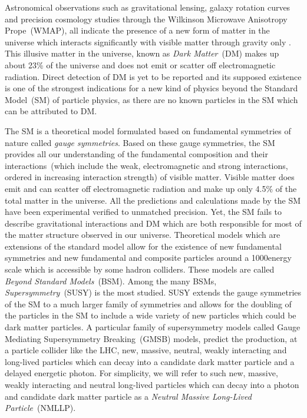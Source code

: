 \par
  Astronomical observations such as gravitational lensing, galaxy rotation curves and precision cosmology studies through the Wilkinson Microwave Anisotropy Prope~(WMAP), all indicate the presence of a new form of matter in the universe which interacts significantly with visible matter through gravity only \cite{DM}. This illusive matter in the universe, known as \textit{Dark Matter}~(DM) makes up about 23\% of the universe and does not emit or scatter off electromagnetic radiation. Direct detection of  DM is yet to be reported and its supposed existence is one of the strongest indications for a new kind of physics beyond the Standard Model~(SM) of particle physics, as there are no known particles in the SM which can be attributed to DM. 
\par
The SM is a theoretical model formulated based on fundamental symmetries of nature called \textit{gauge symmetries}. Based on these gauge symmetries, the SM provides all our understanding of the fundamental composition and their interactions~(which include the weak, electromagnetic and strong interactions, ordered in increasing interaction strength) of visible matter. Visible matter does emit and can scatter off electromagnetic radiation and make up only 4.5\% of the total matter in the universe. All the predictions and calculations made by the SM have been experimental verified to unmatched precision. Yet, the SM fails to describe gravitational interactions and DM which are both responsible for most of the matter structure observed in our universe. 
\newline
Theoretical models which are extensions of the standard model allow for the existence of new fundamental symmetries and new fundamental and composite particles around a 1000\GeV energy scale which is accessible by some hadron colliders. These models are called \textit{Beyond Standard Models}~(BSM). Among the many BSMs, \textit{Supersymmetry}~(SUSY) is the most studied.  SUSY extends the gauge symmetries of the SM to a much larger family of symmetries and allows for the doubling of the particles in the SM to include a wide variety of new particles which could be dark matter particles\cite{SUSYDM,LSPDM}. A particular family of supersymmetry models called Gauge Mediating Supersymmetry Breaking~(GMSB) models, predict the production, at a particle collider like the LHC, new, massive, neutral, weakly interacting and long-lived particles which can decay into a candidate dark matter particle and a delayed energetic photon. For simplicity, we will refer to such new, massive, weakly interacting and neutral long-lived particles which can decay into a photon and candidate dark matter particle as a \textit{Neutral Massive Long-Lived Particle}~(NMLLP).
